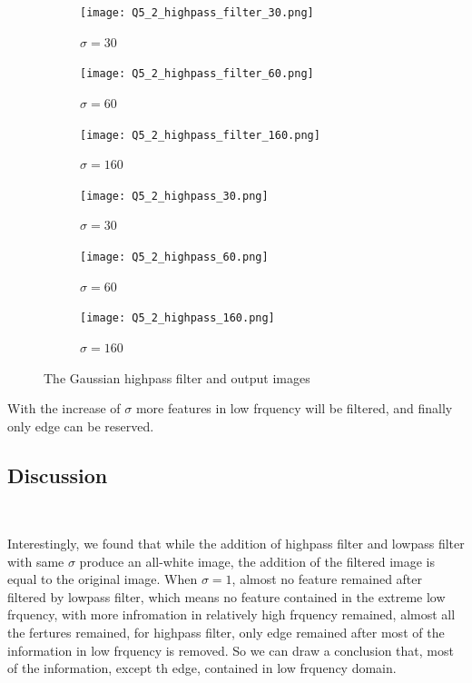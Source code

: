 \documentclass[
	12pt, %
]{style/fphw}
\begin{document}
\begin{figure}[H]
    \centering
     \begin{subfigure}[b]{.3\textwidth}
         \centering
         \texttt{[image: Q5\_2\_highpass\_filter\_30.png]}
         \caption{$\sigma=30$}
         \label{Q5_2_highpass_filter_30}
     \end{subfigure}
     \hfill
     \begin{subfigure}[b]{.3\textwidth}
         \centering
         \texttt{[image: Q5\_2\_highpass\_filter\_60.png]}
         \caption{$\sigma=60$}
         \label{Q5_2_high_filter_60}
     \end{subfigure}
     \hfill
     \begin{subfigure}[b]{.3\textwidth}
         \centering
         \texttt{[image: Q5\_2\_highpass\_filter\_160.png]}
         \caption{$\sigma=160$}
         \label{Q5_2_highpass_filter_160}
     \end{subfigure}
     \vfill
     \begin{subfigure}[b]{.3\textwidth}
         \centering
         \texttt{[image: Q5\_2\_highpass\_30.png]}
         \caption{$\sigma=30$}
         \label{Q5_2_highpass_30}
     \end{subfigure}
     \hfill
     \begin{subfigure}[b]{.3\textwidth}
         \centering
         \texttt{[image: Q5\_2\_highpass\_60.png]}
         \caption{$\sigma=60$}
         \label{Q5_2_highpass_60}
     \end{subfigure}
     \hfill
     \begin{subfigure}[b]{.3\textwidth}
         \centering
         \texttt{[image: Q5\_2\_highpass\_160.png]}
         \caption{$\sigma=160$}
         \label{Q5_2_highpass_160}
     \end{subfigure}
     
    \caption{The Gaussian highpass filter and output images}
    \label{Gaussian highpass filter}
\end{figure}

With the increase of $\sigma$ more features in low frquency will be filtered, and finally only edge can be reserved.

\subsection*{Discussion} \

Interestingly, we found that while the addition of highpass filter and lowpass filter with same $\sigma$ produce an all-white image, the addition of the filtered image is equal to the original image. When $\sigma=1$, almost no feature remained after filtered by lowpass filter, which means no feature contained in the extreme low frquency, with more infromation in relatively high frquency remained, almost all the fertures remained, for highpass filter, only edge remained after most of the information in low frquency is removed. So we can draw a conclusion that, most of the information, except th edge, contained in low frquency domain.
\end{document}
